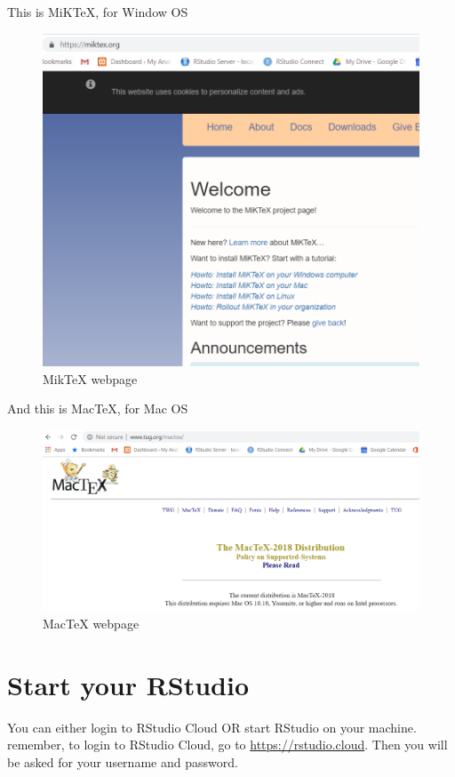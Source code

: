 \documentclass[
]{book}
\begin{document}
This is MiKTeX, for Window OS

\begin{figure}
\centering
\includegraphics{miktex.PNG}
\caption{MikTeX webpage}
\end{figure}

And this is MacTeX, for Mac OS

\begin{figure}
\centering
\includegraphics{mactex.PNG}
\caption{MacTeX webpage}
\end{figure}

\hypertarget{start-your-rstudio}{%
\section{Start your RStudio}\label{start-your-rstudio}}

You can either login to RStudio Cloud OR start RStudio on your machine. remember, to login to RStudio Cloud, go to \url{https://rstudio.cloud}. Then you will be asked for your username and password.
\end{document}
